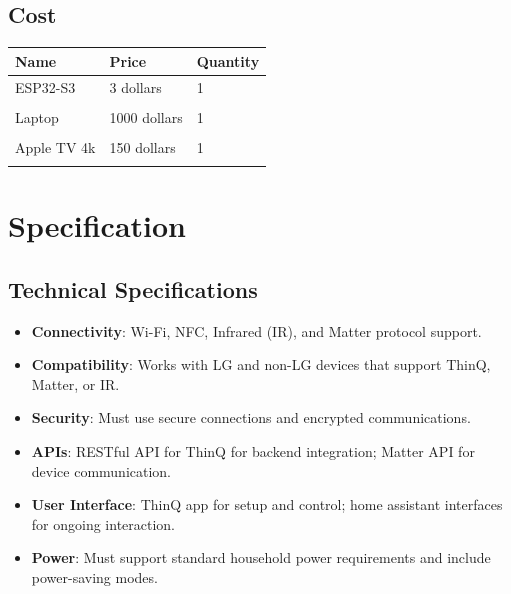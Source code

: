 \documentclass[conference]{IEEEtran}
\begin{document}
\begin{enumerate}[label=\arabic*.]
\end{enumerate}

\subsection{\large{Cost}}
\begin{table}[H]
\center
\begin{tabular}{m{1.7cm} m{1.4cm} m{1.4cm}}
\toprule
Name & Price & Quantity\\
\midrule
ESP32-S3 & 3 dollars &1\\\\
Laptop & 1000 dollars & 1\\\\
Apple TV 4k & 150 dollars & 1\\\\
\bottomrule
\end{tabular}
\end{table}

\section{\large{Specification}}

\subsection{\large{Technical Specifications}}
\begin{itemize}
\item \textbf{Connectivity}: Wi-Fi, NFC, Infrared (IR), and Matter protocol support.\\
\item \textbf{Compatibility}: Works with LG and non-LG devices that support ThinQ, Matter, or IR.\\
\item \textbf{Security}: Must use secure connections and encrypted communications.\\
\item \textbf{APIs}: RESTful API for ThinQ for backend integration; Matter API for device communication.\\
\item \textbf{User Interface}: ThinQ app for setup and control; home assistant interfaces for ongoing interaction.\\
\item \textbf{Power}: Must support standard household power requirements and include power-saving modes.\\
\end{itemize}
\end{document}
